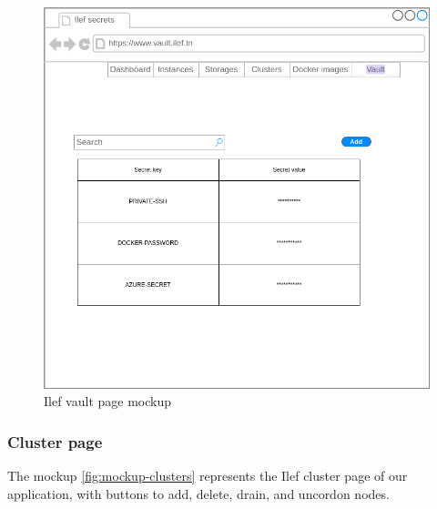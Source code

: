 \begin{figure}[h]
  \center
  \includegraphics[width=13cm]{./chapters/preliminary_study/mockup-vault.png}
  \caption{Ilef vault page mockup}
  \label{fig:mockup-vault}
\end{figure}

\subsubsection{Cluster page}


The mockup \hyperref[fig:mockup-clusters]{\ref{fig:mockup-clusters}} represents the Ilef cluster page of our application, with buttons to add, delete, drain, and uncordon nodes.

